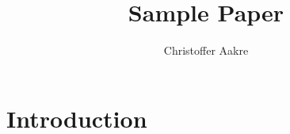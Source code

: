 \documentclass{classes/paper}
\title{Sample Paper}
\author{Christoffer Aakre}
\begin{document}
\maketitle

\section{Introduction}
\cite{inverse-square}

\printbibliography
\end{document}
